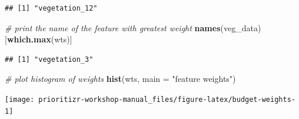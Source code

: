 \documentclass[12pt,]{book}
\newenvironment{Shaded}{\begin{snugshade}}{\end{snugshade}}
\newcommand{\CommentTok}[1]{\textcolor[rgb]{0.56,0.35,0.01}{\textit{#1}}}
\newcommand{\DataTypeTok}[1]{\textcolor[rgb]{0.13,0.29,0.53}{#1}}
\newcommand{\FloatTok}[1]{\textcolor[rgb]{0.00,0.00,0.81}{#1}}
\newcommand{\KeywordTok}[1]{\textcolor[rgb]{0.13,0.29,0.53}{\textbf{#1}}}
\newcommand{\NormalTok}[1]{#1}
\newcommand{\OperatorTok}[1]{\textcolor[rgb]{0.81,0.36,0.00}{\textbf{#1}}}
\newcommand{\OtherTok}[1]{\textcolor[rgb]{0.56,0.35,0.01}{#1}}
\newcommand{\StringTok}[1]{\textcolor[rgb]{0.31,0.60,0.02}{#1}}
\begin{document}
\begin{verbatim}
## [1] "vegetation_12"
\end{verbatim}

\begin{Shaded}
\begin{Highlighting}[]
\CommentTok{# print the name of the feature with greatest weight}
\KeywordTok{names}\NormalTok{(veg_data)[}\KeywordTok{which.max}\NormalTok{(wts)]}
\end{Highlighting}
\end{Shaded}

\begin{verbatim}
## [1] "vegetation_3"
\end{verbatim}

\begin{Shaded}
\begin{Highlighting}[]
\CommentTok{# plot histogram of weights}
\KeywordTok{hist}\NormalTok{(wts, }\DataTypeTok{main =} \StringTok{"feature weights"}\NormalTok{)}
\end{Highlighting}
\end{Shaded}

\begin{center}\texttt{[image: prioritizr-workshop-manual\_files/figure-latex/budget-weights-1]} \end{center}

\begin{Shaded}
\end{Shaded}
\end{document}

